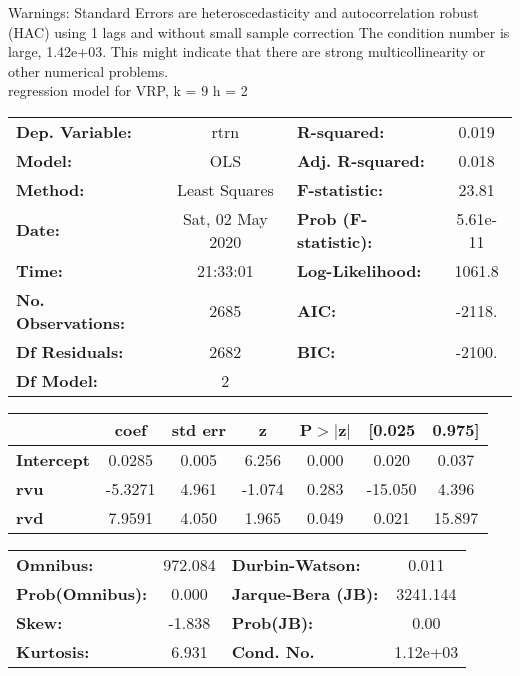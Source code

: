 Warnings: \newline
 [1] Standard Errors are heteroscedasticity and autocorrelation robust (HAC) using 1 lags and without small sample correction \newline
 [2] The condition number is large, 1.42e+03. This might indicate that there are \newline
 strong multicollinearity or other numerical problems.\\ 

regression model for VRP, k = 9 h = 2\begin{center}
\begin{tabular}{lclc}
\toprule
\textbf{Dep. Variable:}    &       rtrn       & \textbf{  R-squared:         } &     0.019   \\
\textbf{Model:}            &       OLS        & \textbf{  Adj. R-squared:    } &     0.018   \\
\textbf{Method:}           &  Least Squares   & \textbf{  F-statistic:       } &     23.81   \\
\textbf{Date:}             & Sat, 02 May 2020 & \textbf{  Prob (F-statistic):} &  5.61e-11   \\
\textbf{Time:}             &     21:33:01     & \textbf{  Log-Likelihood:    } &    1061.8   \\
\textbf{No. Observations:} &        2685      & \textbf{  AIC:               } &    -2118.   \\
\textbf{Df Residuals:}     &        2682      & \textbf{  BIC:               } &    -2100.   \\
\textbf{Df Model:}         &           2      & \textbf{                     } &             \\
\bottomrule
\end{tabular}
\begin{tabular}{lcccccc}
                   & \textbf{coef} & \textbf{std err} & \textbf{z} & \textbf{P$> |$z$|$} & \textbf{[0.025} & \textbf{0.975]}  \\
\midrule
\textbf{Intercept} &       0.0285  &        0.005     &     6.256  &         0.000        &        0.020    &        0.037     \\
\textbf{rvu}       &      -5.3271  &        4.961     &    -1.074  &         0.283        &      -15.050    &        4.396     \\
\textbf{rvd}       &       7.9591  &        4.050     &     1.965  &         0.049        &        0.021    &       15.897     \\
\bottomrule
\end{tabular}
\begin{tabular}{lclc}
\textbf{Omnibus:}       & 972.084 & \textbf{  Durbin-Watson:     } &    0.011  \\
\textbf{Prob(Omnibus):} &   0.000 & \textbf{  Jarque-Bera (JB):  } & 3241.144  \\
\textbf{Skew:}          &  -1.838 & \textbf{  Prob(JB):          } &     0.00  \\
\textbf{Kurtosis:}      &   6.931 & \textbf{  Cond. No.          } & 1.12e+03  \\
\bottomrule
\end{tabular}
\end{center}

